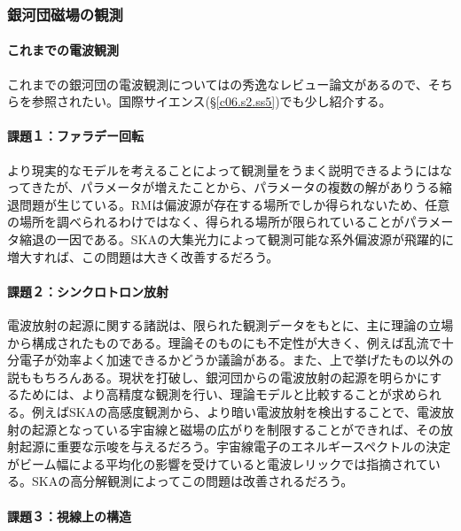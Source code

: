 \subsubsection{銀河団磁場の観測}
\label{c06.s1.ss5.sss3}

\paragraph{これまでの電波観測}

これまでの銀河団の電波観測については\cite{2012A&ARv..20...54F}の秀逸なレビュー論文があるので、そちらを参照されたい。国際サイエンス(\S \ref{c06.s2.ss5})でも少し紹介する。

\paragraph{課題１：ファラデー回転}

より現実的なモデルを考えることによって観測量をうまく説明できるようにはなってきたが、パラメータが増えたことから、パラメータの複数の解がありうる縮退問題が生じている。RMは偏波源が存在する場所でしか得られないため、任意の場所を調べられるわけではなく、得られる場所が限られていることがパラメータ縮退の一因である。SKAの大集光力によって観測可能な系外偏波源が飛躍的に増大すれば、この問題は大きく改善するだろう。

\paragraph{課題２：シンクロトロン放射}

電波放射の起源に関する諸説は、限られた観測データをもとに、主に理論の立場から構成されたものである。理論そのものにも不定性が大きく、例えば乱流で十分電子が効率よく加速できるかどうか議論がある。また、上で挙げたもの以外の説ももちろんある。現状を打破し、銀河団からの電波放射の起源を明らかにするためには、より高精度な観測を行い、理論モデルと比較することが求められる。例えばSKAの高感度観測から、より暗い電波放射を検出することで、電波放射の起源となっている宇宙線と磁場の広がりを制限することができれば、その放射起源に重要な示唆を与えるだろう。宇宙線電子のエネルギースペクトルの決定がビーム幅による平均化の影響を受けていると電波レリックでは指摘されている。SKAの高分解観測によってこの問題は改善されるだろう。

\paragraph{課題３：視線上の構造}

